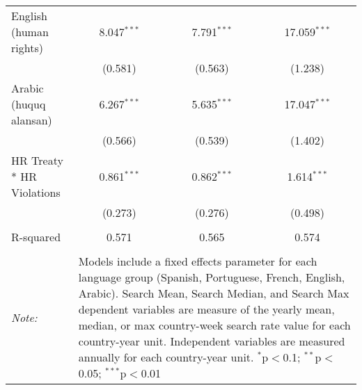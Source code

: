\begin{table}[!htbp]
\begin{tabular}{@{\extracolsep{5pt}}lccc}
  English (human rights) & 8.047$^{***}$ & 7.791$^{***}$ & 17.059$^{***}$ \\ 
  & (0.581) & (0.563) & (1.238) \\ 
  Arabic (huquq alansan) & 6.267$^{***}$ & 5.635$^{***}$ & 17.047$^{***}$ \\ 
  & (0.566) & (0.539) & (1.402) \\ 
  HR Treaty * HR Violations & 0.861$^{***}$ & 0.862$^{***}$ & 1.614$^{***}$ \\ 
  & (0.273) & (0.276) & (0.498) \\ 
 \hline \\[-1.8ex] 
R-squared  & 0.571 & 0.565 & 0.574 \\ 
\hline 
\hline \\[-1.8ex] 
\textit{Note:}  & \multicolumn{3}{l}{\parbox[t]{8cm}{Models include a fixed effects parameter for each language group (Spanish, Portuguese, French, English, Arabic). Search Mean, Search Median, and Search Max dependent variables are measure of the yearly mean, median, or max country-week search rate value for each country-year unit. Independent variables are measured annually for each country-year unit. $^{*}$p$<$0.1; $^{**}$p$<$0.05; $^{***}$p$<$0.01}} \\ 
\end{tabular} 
\end{table} 
